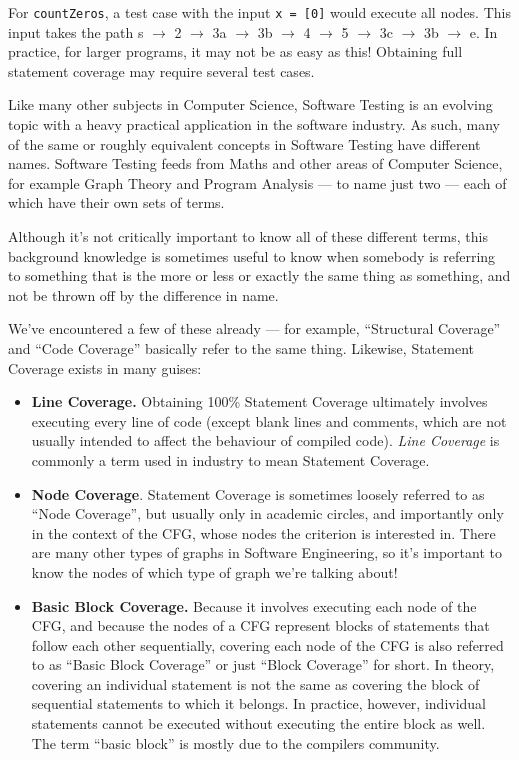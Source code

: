 
For {\tt countZeros}, a test case with the input {\tt x = [0]} would execute all
nodes. This input takes the path s $\rightarrow$ 2 $\rightarrow$ 3a
$\rightarrow$ 3b $\rightarrow$ 4 $\rightarrow$ 5 $\rightarrow$ 3c $\rightarrow$
3b $\rightarrow$ e. In practice, for larger programs, it may not be as easy as
this! Obtaining full statement coverage may require several test cases. 
    

Like many other subjects in Computer Science, Software Testing is an evolving
topic with a heavy practical application in the software industry. As such, many
of the same or roughly equivalent concepts in Software Testing have different
names. Software Testing feeds from Maths and other areas of Computer Science,
for example Graph Theory and Program Analysis --- to name just two --- each of
which have their own sets of terms.

Although it's not critically important to know all of these different terms,
this background knowledge is sometimes useful to know when somebody is referring
to something that is the more or less or exactly the same thing as something,
and not be thrown off by the difference in name. 

We've encountered a few of these already --- for example, ``Structural
Coverage'' and ``Code Coverage'' basically refer to the same thing. Likewise,
Statement Coverage exists in many guises:


\begin{itemize}
    \item {\bf Line Coverage.} Obtaining 100\% Statement Coverage ultimately
    involves executing every line of code (except blank lines and comments,
    which are not usually intended to affect the behaviour of compiled code).
    {\it Line Coverage} is commonly a term used in industry to mean Statement
    Coverage.

    \item {\bf Node Coverage}. Statement Coverage is sometimes loosely referred
    to as ``Node Coverage'', but usually only in academic circles, and
    importantly only in the context of the CFG, whose nodes the criterion is
    interested in. There are many other types of graphs in Software Engineering,
    so it's important to know the nodes of which type of graph we're talking
    about!
    
    \item {\bf Basic Block Coverage.} Because it involves executing each node of
    the CFG, and because the nodes of a CFG represent blocks of statements that
    follow each other sequentially, covering each node of the CFG is also
    referred to as ``Basic Block Coverage'' or just ``Block Coverage'' for
    short. In theory, covering an individual statement is not the same as
    covering the block of sequential statements to which it belongs. In
    practice, however, individual statements cannot be executed without
    executing the entire block as well. The term ``basic block'' is mostly due
    to the compilers community. 
\end{itemize}


